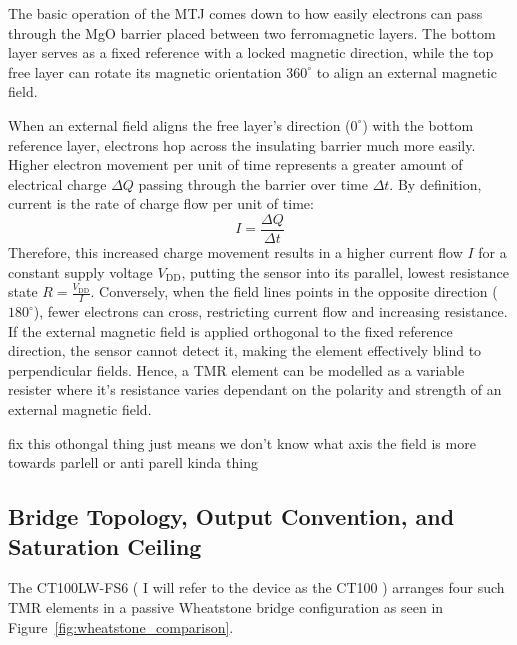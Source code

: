 \documentclass[12pt,a4paper]{article}
\begin{document}
The basic operation of the MTJ comes down to how easily electrons can pass through the MgO barrier placed between two ferromagnetic layers. The bottom layer serves as a fixed reference with a locked magnetic direction, while the top free layer can rotate its magnetic orientation $360^\circ$ to align an external magnetic field.

When an external field aligns the free layer's direction  ($0^\circ$) with the bottom reference layer, electrons hop across the insulating barrier much more easily. Higher electron movement per unit of time represents a greater amount of electrical charge $\Delta Q$ passing through the barrier over time $\Delta t$. By definition, current is the rate of charge flow per unit of time:
\begin{equation}
    I = \frac{\Delta Q}{\Delta t}
\end{equation}
Therefore, this increased charge movement results in a higher current flow $I$ for a constant supply voltage $V_{\text{DD}}$, putting the sensor into its parallel, lowest resistance state $R = \frac{V_{\text{DD}}}{I}$. Conversely, when the field lines points in the opposite direction ($180^\circ$), fewer electrons can cross, restricting current flow and increasing resistance. If the external magnetic field is applied orthogonal to the fixed reference direction, the sensor cannot detect it, making the element effectively blind to perpendicular fields. Hence, a TMR element can be modelled as a variable resister where it's resistance varies dependant on the polarity and strength of an external magnetic field. 


fix this othongal thing just means we don't know what axis the field is more towards parlell or anti parell kinda thing


\subsection{Bridge Topology, Output Convention, and Saturation Ceiling}
\label{sec:bridge-topology}




The CT100LW-FS6 ( I will refer to the device as the CT100 ) arranges four such TMR elements in a passive Wheatstone bridge configuration as seen in Figure~\ref{fig:wheatstone_comparison}.
\end{document}
